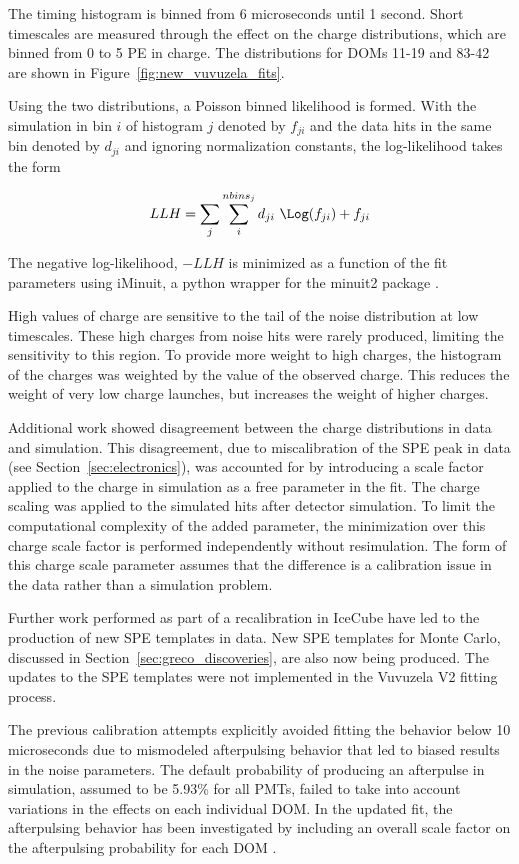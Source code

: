 The timing histogram is binned from 6 microseconds until 1 second.
Short timescales are measured through the effect on the charge distributions, which are binned from 0 to 5 PE in charge.
The distributions for DOMs 11-19 and 83-42 are shown in Figure~\ref{fig:new_vuvuzela_fits}.

Using the two distributions, a Poisson binned likelihood is formed.
With the simulation in bin $i$ of histogram $j$ denoted by $f_{ji}$ and the data hits in the same bin denoted by $d_{ji}$ and ignoring normalization constants, the log-likelihood takes the form

\begin{equation}
	LLH = \sum_j \sum_i^{{nbins}_j} d_{ji}\ \Log(f_{ji}) + f_{ji}
\end{equation}

The negative log-likelihood, $-LLH$ is minimized as a function of the fit parameters using iMinuit, a python wrapper for the minuit2 package \cite{iminuit-code, iminuit-paper}.

High values of charge are sensitive to the tail of the noise distribution at low timescales.
These high charges from noise hits were rarely produced, limiting the sensitivity to this region.
To provide more weight to high charges, the histogram of the charges was weighted by the value of the observed charge.
This reduces the weight of very low charge launches, but increases the weight of higher charges.

Additional work showed disagreement between the charge distributions in data and simulation. 
This disagreement, due to miscalibration of the SPE peak in data (see Section~\ref{sec:electronics}), was accounted for by introducing a scale factor applied to the charge in simulation as a free parameter in the fit.
The charge scaling was applied to the simulated hits after detector simulation.
To limit the computational complexity of the added parameter, the minimization over this charge scale factor is performed independently without resimulation.
The form of this charge scale parameter assumes that the difference is a calibration issue in the data rather than a simulation problem.

Further work performed as part of a recalibration in IceCube have led to the production of new SPE templates in data.
New SPE templates for Monte Carlo, discussed in Section~\ref{sec:greco_discoveries}, are also now being produced.
The updates to the SPE templates were not implemented in the Vuvuzela V2 fitting process.

The previous calibration attempts explicitly avoided fitting the behavior below 10 microseconds due to mismodeled afterpulsing behavior that led to biased results in the noise parameters.
The default probability of producing an afterpulse in simulation, assumed to be 5.93\% for all PMTs, failed to take into account variations in the effects on each individual DOM.
In the updated fit, the afterpulsing behavior has been investigated by including an overall scale factor on the afterpulsing probability for each DOM .

